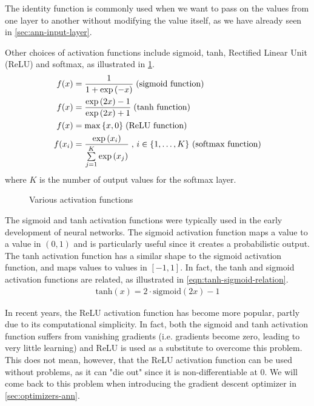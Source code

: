 The identity function is commonly used when we want to pass on the values from one layer to another without modifying the value itself, as we have already seen in \cref{sec:ann-input-layer}.

Other choices of activation functions include  sigmoid, tanh, Rectified Linear Unit (ReLU) and softmax, as illustrated in \cref{fig:activation-functions}.
\begin{align}
    \label{eqn:sigmoid-function}
    f(x) &= \frac{1}{1 + \exp{ \left( -x \right) }} \thickspace \text{(sigmoid function)} \\
    \label{eqn:tanh-function}
    f(x) &= \frac{\exp{ \left( 2x \right) } - 1}{\exp{ \left( 2x \right) } + 1} \thickspace \text{(tanh function)} \\
    \label{eqn:relu-function}
    f(x) &= \max{\left\{ x, 0 \right\}} \thickspace \text{(ReLU function)} \\
    \label{eqn:softmax-function}
    f(x_i) &= \frac{\exp \left( x_i \right)}{\sum\limits_{j=1}^{K} \exp \left( x_j \right)} \thickspace \text{, $i \in \left\{ 1, \ldots, K \right\}$ (softmax function)}
\end{align}
where $K$ is the number of output values for the softmax layer.

\begin{figure}[H]
    \centering
    
    \caption{Various activation functions}
    \label{fig:activation-functions}
\end{figure}

The sigmoid and tanh activation functions were typically used in the early development of neural networks. The sigmoid activation function maps a value to a value in $(0, 1)$ and is particularly useful since it creates a probabilistic output. The tanh activation function has a similar shape to the sigmoid activation function, and maps values to values in $[-1, 1]$. In fact, the tanh and sigmoid activation functions are related, as illustrated in \cref{eqn:tanh-sigmoid-relation}.
\begin{align}
    \label{eqn:tanh-sigmoid-relation}
    \text{tanh}(x) = 2 \cdot \text{sigmoid}(2x) - 1
\end{align}

In recent years, the ReLU activation function has become more popular, partly due to its computational simplicity. In fact, both the sigmoid and tanh activation function suffers from vanishing gradients (i.e. gradients become zero, leading to very little learning) and ReLU is used as a substitute to overcome this problem. This does not mean, however, that the ReLU activation function can be used without problems, as it can "die out" since it is non-differentiable at 0. We will come back to this problem when introducing the gradient descent optimizer in \cref{sec:optimizers-ann}.

